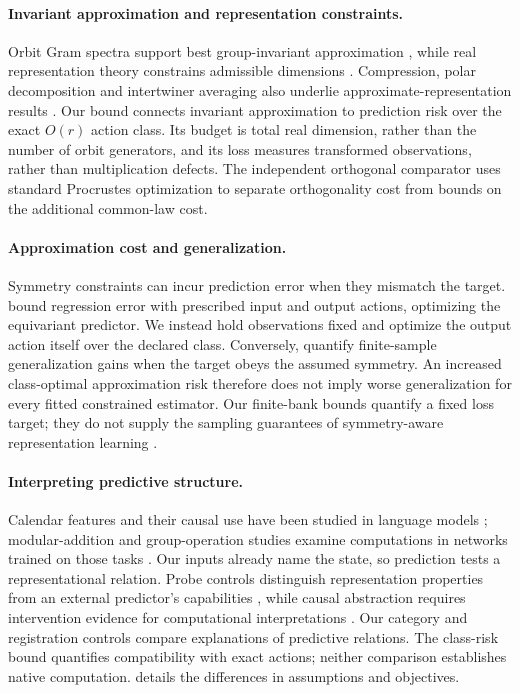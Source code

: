 \paragraph{Invariant approximation and representation constraints.}
Orbit Gram spectra support best group-invariant approximation \citep{barbieri2020approximation}, while real representation theory constrains admissible dimensions \citep{serre1977linear}. Compression, polar decomposition and intertwiner averaging also underlie approximate-representation results \citep{moore2015approximate,gowers2017inverse}. Our bound connects invariant approximation to prediction risk over the exact $O(r)$ action class. Its budget is total real dimension, rather than the number of orbit generators, and its loss measures transformed observations, rather than multiplication defects. The independent orthogonal comparator uses standard Procrustes optimization to separate orthogonality cost from bounds on the additional common-law cost.

\paragraph{Approximation cost and generalization.}
Symmetry constraints can incur prediction error when they mismatch the target. \citet{wang2023equivariance} bound regression error with prescribed input and output actions, optimizing the equivariant predictor. We instead hold observations fixed and optimize the output action itself over the declared class. Conversely, \citet{elesedy2021generalisation} quantify finite-sample generalization gains when the target obeys the assumed symmetry. An increased class-optimal approximation risk therefore does not imply worse generalization for every fitted constrained estimator. Our finite-bank bounds quantify a fixed loss target; they do not supply the sampling guarantees of symmetry-aware representation learning \citep{ordonez2026inference}.

\paragraph{Interpreting predictive structure.}
Calendar features and their causal use have been studied in language models \citep{engels2025notall}; modular-addition and group-operation studies examine computations in networks trained on those tasks \citep{nanda2023progress,chughtai2023toy,wu2025unified}. Our inputs already name the state, so prediction tests a representational relation. Probe controls distinguish representation properties from an external predictor's capabilities \citep{hewitt2019designing}, while causal abstraction requires intervention evidence for computational interpretations \citep{geiger2022inducing,geiger2025causal}. Our category and registration controls compare explanations of predictive relations. The class-risk bound quantifies compatibility with exact actions; neither comparison establishes native computation.  details the differences in assumptions and objectives.
